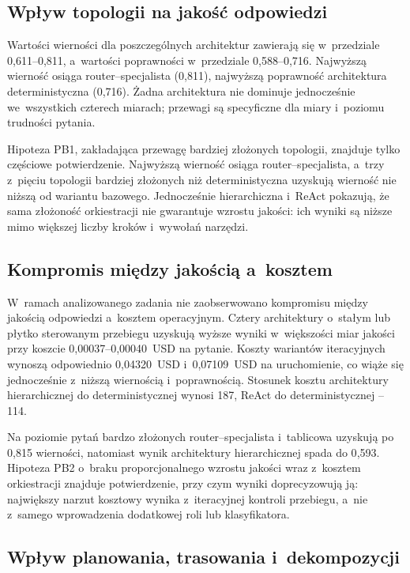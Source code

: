 \subsection{Wpływ topologii na jakość odpowiedzi}\label{subsec:wplyw-topologii-na-jakosc-odpowiedzi}

Wartości wierności dla poszczególnych architektur zawierają się w~przedziale
0{,}611--0{,}811, a~wartości poprawności w~przedziale 0{,}588--0{,}716.
Najwyższą wierność osiąga router--specjalista (0{,}811), najwyższą poprawność
architektura deterministyczna (0{,}716). Żadna architektura nie dominuje
jednocześnie we~wszystkich czterech miarach; przewagi są specyficzne dla miary
i~poziomu trudności pytania.

Hipoteza PB1, zakładająca przewagę bardziej złożonych topologii, znajduje tylko
częściowe potwierdzenie. Najwyższą wierność osiąga router--specjalista, a~trzy
z~pięciu topologii bardziej złożonych niż deterministyczna uzyskują wierność
nie niższą od wariantu bazowego. Jednocześnie hierarchiczna i~ReAct pokazują,
że sama złożoność orkiestracji nie gwarantuje wzrostu jakości: ich wyniki są
niższe mimo większej liczby kroków i~wywołań narzędzi.

\subsection{Kompromis między jakością a~kosztem}\label{subsec:kompromis-miedzy-jakoscia-a-kosztem}

W~ramach analizowanego zadania nie zaobserwowano kompromisu między jakością
odpowiedzi a~kosztem operacyjnym. Cztery architektury o~stałym lub płytko
sterowanym przebiegu uzyskują wyższe wyniki w~większości miar jakości przy
koszcie 0{,}00037--0{,}00040~USD na pytanie. Koszty wariantów iteracyjnych
wynoszą odpowiednio 0{,}04320~USD i~0{,}07109~USD na uruchomienie, co wiąże się
jednocześnie z~niższą wiernością i~poprawnością. Stosunek kosztu architektury
hierarchicznej do deterministycznej wynosi 187, ReAct do deterministycznej --
114.

Na poziomie pytań bardzo złożonych router--specjalista i~tablicowa uzyskują po
0{,}815 wierności, natomiast wynik architektury hierarchicznej spada do
0{,}593. Hipoteza PB2 o~braku proporcjonalnego wzrostu jakości wraz z~kosztem
orkiestracji znajduje potwierdzenie, przy czym wyniki doprecyzowują ją:
największy narzut kosztowy wynika z~iteracyjnej kontroli przebiegu, a~nie
z~samego wprowadzenia dodatkowej roli lub klasyfikatora.

\subsection{Wpływ planowania, trasowania i~dekompozycji}\label{subsec:wplyw-planowania-trasowania-i-dekompozycji}

